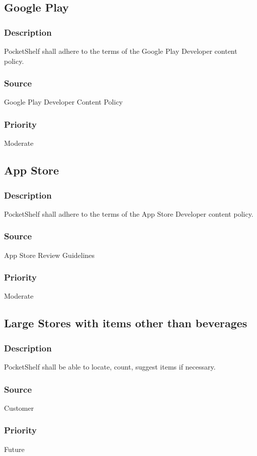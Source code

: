 \subsection{Google Play}
\subsubsection{Description}
PocketShelf shall adhere to the terms of the Google Play Developer content policy.
\subsubsection{Source}
 Google Play Developer Content Policy 
\subsubsection{Priority}
Moderate\\


\subsection{App Store}
\subsubsection{Description}
PocketShelf shall adhere to the terms of the App Store Developer content policy.
\subsubsection{Source}
App Store Review Guidelines

\subsubsection{Priority}
Moderate

\subsection{Large Stores with items other than beverages}
\subsubsection{Description}
PocketShelf shall be able to locate, count, suggest items if necessary.
\subsubsection{Source}
Customer
\subsubsection{Priority}
Future